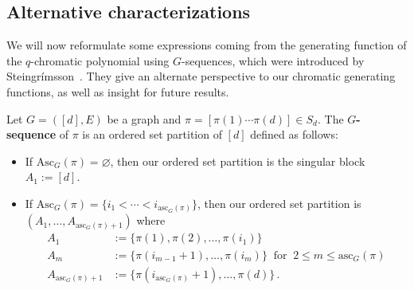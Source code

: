 \documentclass[11pt]{amsart}
\renewcommand\emptyset{\varnothing}
\newcommand\Def[1]{{\bf #1}}
\newcommand{\asc}{\mathrm{Asc}}
\newcommand{\ascnum}{\mathrm{asc}}
\begin{document}
\subsection{Alternative characterizations}
We will now reformulate some expressions coming from the generating function of the $q$-chromatic polynomial
using $G$-sequences, which were introduced by Steingrímsson~\cite{steingrimssoncoloring}. They give an alternate
perspective to our chromatic generating functions, as well as insight for future results.

Let $G=([d],E)$ be a graph and $\pi = [\pi(1) \cdots \pi(d)] \in S_d$. 
The \Def{$G$-sequence} of $\pi$ is an ordered set partition of $[d]$ defined as follows:
\begin{itemize}
    \item If $\asc_G(\pi) = \emptyset$, then our ordered set partition is the singular block $A_1 := [d]$.
    \item If $\asc_G(\pi) =\{i_1 < \cdots < i_{\ascnum_G(\pi)} \}$, then our ordered set partition is $(A_1, \ldots, A_{\ascnum_G(\pi)+1})$
    where
\begin{align*}
        A_1 &:= \{\pi(1), \pi(2),\ldots,\pi(i_1)\} \\
        A_m &:= \{\pi(i_{m-1} +1), \ldots, \pi(i_{m}) \} \ \text{ for } \ 2 \le m \le \ascnum_G(\pi) \\
        A_{\ascnum_G(\pi)+1} &:= \{\pi(i_{\ascnum_G(\pi)} +1),\ldots, \pi(d)\} \, .
\end{align*}
\end{itemize}
\end{document}
